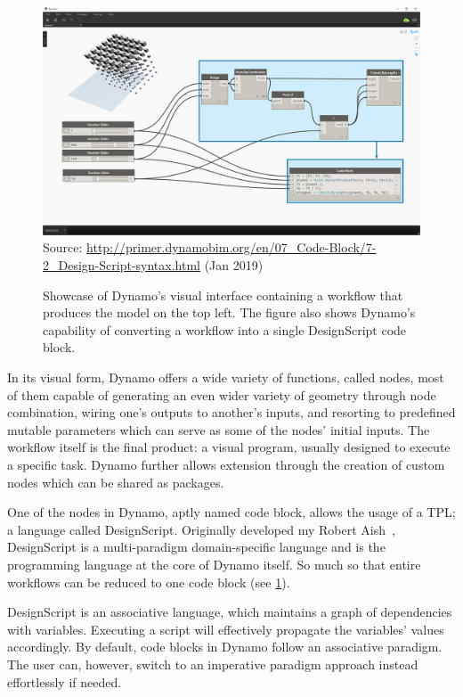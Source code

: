\begin{figure}[htb]
  \includegraphics[width=\textwidth]{fig/dynamo-node-to-code}\\
  {\scriptsize
  Source: \url{http://primer.dynamobim.org/en/07_Code-Block/7-2_Design-Script-syntax.html}
  (Jan 2019)
  }
  \caption[Dynamo's visual interface with node to code translation]{
    Showcase of Dynamo's visual interface containing a workflow that produces
    the model on the top left.  The figure also shows Dynamo's capability of
    converting a workflow into a single DesignScript code block.}%
  \label{fig:related.ad.dynamo.node2code}
\end{figure}

In its visual form, Dynamo offers a wide variety of functions, called nodes,
most of them capable of generating an even wider variety of geometry through
node combination, wiring one's outputs to another's inputs, and resorting to
predefined mutable parameters which can serve as some of the nodes' initial
inputs.  The workflow itself is the final product: a visual program, usually
designed to execute a specific task.  Dynamo further allows extension through the
creation of custom nodes which can be shared as packages.

One of the nodes in Dynamo, aptly named code block, allows the usage of a
\ac{TPL}; a language called DesignScript.  Originally developed my Robert
Aish~\cite{Aish:2011:DesignScript}, DesignScript is a multi-paradigm
domain-specific language and is the programming language at the core of Dynamo
itself.  So much so that entire workflows can be reduced to one code block (see
\cref{fig:related.ad.dynamo.node2code}).

DesignScript is an associative language, which maintains a graph of dependencies
with variables.  Executing a script will effectively propagate the variables'
values accordingly.  By default, code blocks in Dynamo follow an associative
paradigm.  The user can, however, switch to an imperative paradigm approach
instead effortlessly if needed.

